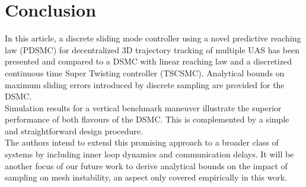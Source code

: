 \documentclass{ifacconf}
\begin{document}
{\section{Conclusion}
\label{sec:conclusion}
In this article, a discrete sliding mode controller using a novel predictive reaching law (PDSMC) for decentralized 3D trajectory tracking of multiple UAS has been presented and compared to a DSMC with linear reaching law and a discretized continuous time Super Twisting controller (TSCSMC). Analytical bounds on maximum sliding errors introduced by discrete sampling are provided for the DSMC.\\ 
Simulation results for a vertical benchmark maneuver illustrate the superior performance of both flavours of the DSMC. This is complemented by a simple and straightforward design procedure.\\ 
The authors intend to extend this promising approach to a broader class of systems by including inner loop dynamics and communication delays. It will be another focus of our future work to derive analytical bounds on the impact of sampling on mesh instability, an aspect only covered empirically in this work.
}

\end{document}
